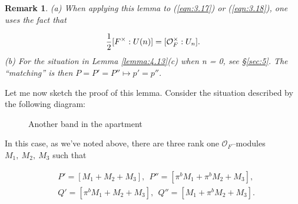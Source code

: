 \documentclass[12pt,letterpaper]{amsart}
\numberwithin{equation}{section}
\newtheorem{remark}{Remark}
\theoremstyle{definition}
\theoremstyle{plain}
\providecommand{\cal}{\mathcal}
\def\off{{\cal O}_F}
\begin{document}
\begin{remark} 
(a) When applying this lemma to (\ref{eqn:3.17}) or 
(\ref{eqn:3.18}), one uses the fact that

\[
{1\over{2}}[F^{\times}:U(n)] = [\off^{\times}:U_n].
\]
(b) For the situation in Lemma \ref{lemma:4.13}(c) when n = 0, 
see \S \ref{sec:5}. The ``matching''
is then $P = P' = P''\longmapsto p'=p''$.
\end{remark}

Let me now sketch the proof of this lemma. Consider the situation
described by the following diagram:

\begin{figure}[htbp]
\centering
{}
\caption{Another band in the apartment \label{fig:4.17}}
\end{figure}

\noindent
In this case, as we've noted above, there are three rank one $\off$--modules
$M_1,\ M_2,\ M_3$ such that

\[
\begin{split}
&P' = [M_1+M_2+M_3],\ \ P''=[\pi^bM_1+\pi^bM_2 +M_3],\\
&Q' = [\pi^bM_1+M_2+M_3],\ \ Q''=[M_1+\pi^bM_2 +M_3].
\end{split}
\]
\end{document}
